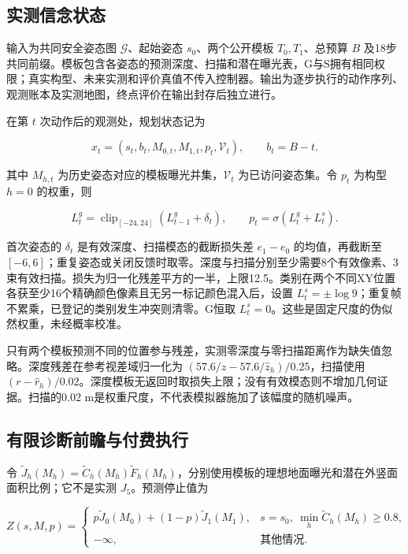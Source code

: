 \documentclass[11pt,a4paper]{article}
\begin{document}
\hypertarget{ux5b9eux6d4bux4fe1ux5ff5ux72b6ux6001}{%
\subsection{实测信念状态}\label{ux5b9eux6d4bux4fe1ux5ff5ux72b6ux6001}}

输入为共同安全姿态图 \(\mathcal G\)、起始姿态 \(s_0\)、两个公开模板 \(T_0,T_1\)、总预算 \(B\) 及18步共同前缀。模板包含各姿态的预测深度、扫描和潜在曝光表，G与S拥有相同权限；真实构型、未来实测和评价真值不传入控制器。输出为逐步执行的动作序列、观测账本及实测地图，终点评价在输出封存后独立进行。

在第 \(t\) 次动作后的观测处，规划状态记为

\[
x_t=(s_t,b_t,M_{0,t},M_{1,t},p_t,\mathcal V_t),\qquad b_t=B-t.
\]

其中 \(M_{h,t}\) 为历史姿态对应的模板曝光并集，\(\mathcal V_t\) 为已访问姿态集。令 \(p_t\) 为构型 \(h=0\) 的权重，则

\[
L_t^g=\operatorname{clip}_{[-24,24]}(L_{t-1}^g+\delta_t),
\qquad p_t=\sigma(L_t^g+L_t^s).
\]

首次姿态的 \(\delta_t\) 是有效深度、扫描模态的截断损失差 \(e_1-e_0\) 的均值，再截断至 \([-6,6]\)；重复姿态或关闭反馈时取零。深度与扫描分别至少需要8个有效像素、3束有效扫描。损失为归一化残差平方的一半，上限12.5。类别在两个不同XY位置各获至少16个精确颜色像素且无另一标记颜色混入后，设置 \(L_t^s=\pm\log9\)；重复帧不累乘，已登记的类别发生冲突则清零。G恒取 \(L_t^s=0\)。这些是固定尺度的伪似然权重，未经概率校准。

只有两个模板预测不同的位置参与残差，实测零深度与零扫描距离作为缺失值忽略。深度残差在参考视差域归一化为 \((57.6/z-57.6/\widehat z_h)/0.25\)，扫描使用 \((r-\widehat r_h)/0.02\)。深度模板无返回时取损失上限；没有有效模态则不增加几何证据。扫描的0.02 m是权重尺度，不代表模拟器施加了该幅度的随机噪声。

\hypertarget{ux6709ux9650ux8bcaux65adux524dux77bbux4e0eux4ed8ux8d39ux6267ux884c}{%
\subsection{有限诊断前瞻与付费执行}\label{ux6709ux9650ux8bcaux65adux524dux77bbux4e0eux4ed8ux8d39ux6267ux884c}}

令 \(\widetilde J_h(M_h)=\widetilde C_h(M_h)\widetilde F_h(M_h)\)，分别使用模板的理想地面曝光和潜在外竖面面积比例；它不是实测 \(J_5\)。预测停止值为

\[
Z(s,M,p)=
\begin{cases}
p\widetilde J_0(M_0)+(1-p)\widetilde J_1(M_1),
&s=s_0,\ \min_h\widetilde C_h(M_h)\ge0.8,\\
-\infty,&\text{其他情况}.
\end{cases}
\]
\end{document}
